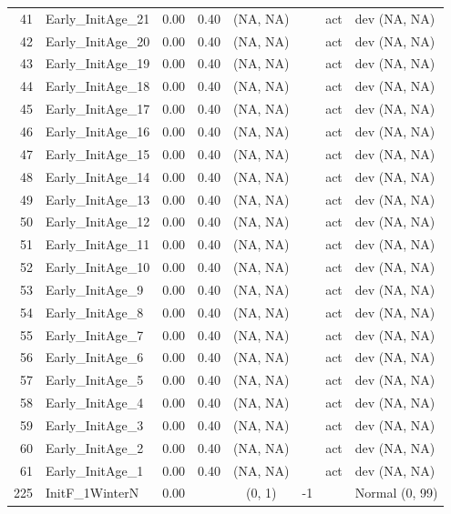 \documentclass[12pt,]{article}
\begin{document}
\begin{landscape}
\begin{longtable}{rlrrcrcl}
  41 & Early\_InitAge\_21 & 0.00 & 0.40 & (NA, NA) &  & act & dev (NA, NA) \\ 
  42 & Early\_InitAge\_20 & 0.00 & 0.40 & (NA, NA) &  & act & dev (NA, NA) \\ 
  43 & Early\_InitAge\_19 & 0.00 & 0.40 & (NA, NA) &  & act & dev (NA, NA) \\ 
  44 & Early\_InitAge\_18 & 0.00 & 0.40 & (NA, NA) &  & act & dev (NA, NA) \\ 
  45 & Early\_InitAge\_17 & 0.00 & 0.40 & (NA, NA) &  & act & dev (NA, NA) \\ 
  46 & Early\_InitAge\_16 & 0.00 & 0.40 & (NA, NA) &  & act & dev (NA, NA) \\ 
  47 & Early\_InitAge\_15 & 0.00 & 0.40 & (NA, NA) &  & act & dev (NA, NA) \\ 
  48 & Early\_InitAge\_14 & 0.00 & 0.40 & (NA, NA) &  & act & dev (NA, NA) \\ 
  49 & Early\_InitAge\_13 & 0.00 & 0.40 & (NA, NA) &  & act & dev (NA, NA) \\ 
  50 & Early\_InitAge\_12 & 0.00 & 0.40 & (NA, NA) &  & act & dev (NA, NA) \\ 
  51 & Early\_InitAge\_11 & 0.00 & 0.40 & (NA, NA) &  & act & dev (NA, NA) \\ 
  52 & Early\_InitAge\_10 & 0.00 & 0.40 & (NA, NA) &  & act & dev (NA, NA) \\ 
  53 & Early\_InitAge\_9 & 0.00 & 0.40 & (NA, NA) &  & act & dev (NA, NA) \\ 
  54 & Early\_InitAge\_8 & 0.00 & 0.40 & (NA, NA) &  & act & dev (NA, NA) \\ 
  55 & Early\_InitAge\_7 & 0.00 & 0.40 & (NA, NA) &  & act & dev (NA, NA) \\ 
  56 & Early\_InitAge\_6 & 0.00 & 0.40 & (NA, NA) &  & act & dev (NA, NA) \\ 
  57 & Early\_InitAge\_5 & 0.00 & 0.40 & (NA, NA) &  & act & dev (NA, NA) \\ 
  58 & Early\_InitAge\_4 & 0.00 & 0.40 & (NA, NA) &  & act & dev (NA, NA) \\ 
  59 & Early\_InitAge\_3 & 0.00 & 0.40 & (NA, NA) &  & act & dev (NA, NA) \\ 
  60 & Early\_InitAge\_2 & 0.00 & 0.40 & (NA, NA) &  & act & dev (NA, NA) \\ 
  61 & Early\_InitAge\_1 & 0.00 & 0.40 & (NA, NA) &  & act & dev (NA, NA) \\ 
  225 & InitF\_1WinterN & 0.00 &  & (0, 1) & -1 &  & Normal (0, 99) \\ 

\end{longtable}
\end{landscape}
\end{document}
